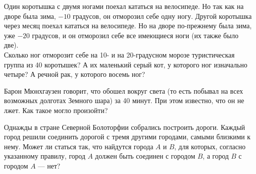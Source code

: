 ﻿
\begin{enumerate}
\itA Один коротышка с двумя ногами поехал кататься на велосипеде. Но так как на дворе была зима, $-10$ градусов, он отморозил себе одну ногу. Другой коротышка через месяц поехал кататься на велосипеде. Но на дворе по-прежнему была зима, уже $-20$ градусов, и он отморозил себе все имеющиеся ноги (их также было две). \smallskip \\
Сколько ног отморозит себе на 10- и на 20-градусном морозе туристическая группа из 40 коротышек? А их маленький серый кот, у которого ног изначально четыре? А речной рак, у которого восемь ног?

\itB Барон Мюнхгаузен говорит, что обошел вокруг света (то есть побывал на всех возможных долготах Земного шара) за 40 минут. При этом известно, что он не лжет. Как такое могло произойти?

\itC Однажды в стране Северной Болоторфии собрались построить дороги. Каждый город решили соединить дорогой с тремя другими городами, самыми близкими к нему. Может ли статься так, что найдутся города $A$ и $B$, для которых, согласно указанному правилу, город $A$ должен быть соединен с городом $B$, а город $B$ с городом $A$ — нет?
\end{enumerate}